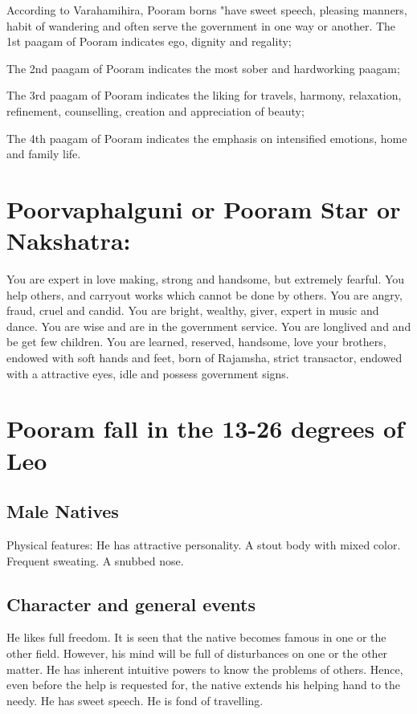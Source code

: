 \documentclass[12pt, right open]{memoir}
\begin{document}
According to Varahamihira, Pooram borns "have sweet speech, pleasing manners, habit of wandering and often serve the government in one way or another.
The 1st paagam of Pooram indicates ego, dignity and regality;

The 2nd paagam of Pooram indicates the most sober and hardworking paagam;

The 3rd paagam of Pooram indicates the liking for travels, harmony, relaxation, refinement, counselling, creation and appreciation of beauty; 

The 4th paagam of Pooram indicates the emphasis on intensified emotions, home and family life. 


\section{Poorvaphalguni or Pooram Star or Nakshatra:}

You are expert in love making, strong and handsome, but extremely fearful. You help others, and carryout works which cannot be done by others. You are angry, fraud, cruel and candid. You are bright, wealthy, giver, expert in music and dance. You are wise and are in the government service. You are longlived and and be get few children. You are learned, reserved, handsome, love your brothers, endowed with soft hands and feet, born of Rajamsha, strict transactor, endowed with a attractive eyes, idle and possess government signs.

\section{Pooram fall in the 13-26 degrees of Leo }

\subsection {Male Natives}
Physical features:
He has attractive personality. A stout body with mixed color. Frequent sweating. A snubbed nose.


\subsection {Character and general events}
He likes full freedom. It is seen that the native becomes famous in one or the other field. However, his mind will be full of disturbances on one or the other matter. He has inherent intuitive powers to know the problems of others. Hence, even before the help is requested for, the native extends his helping hand to the needy. He has sweet speech. He is fond of travelling.
\end{document}
